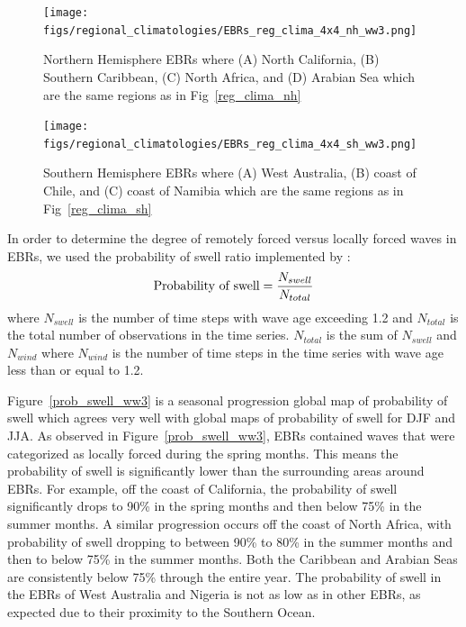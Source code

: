 \documentclass[draft,linenumbers]{agujournal2018}
\begin{document}
\begin{figure}[tbh]
\centering
\begin{minipage}{.5\textwidth}
  \centering
  \texttt{[image: figs/regional\_climatologies/EBRs\_reg\_clima\_4x4\_nh\_ww3.png]}
  \caption{Northern Hemisphere EBRs where (A) North California, (B) Southern Caribbean, (C) North Africa, and (D) Arabian Sea which are the same regions as in Fig~\ref{reg_clima_nh}}
  \label{NH_model_comparison}
\end{minipage}%
\begin{minipage}{.5\textwidth}
  \centering
  \texttt{[image: figs/regional\_climatologies/EBRs\_reg\_clima\_4x4\_sh\_ww3.png]}
  \caption{Southern Hemisphere EBRs where (A) West Australia, (B) coast of Chile, and (C) coast of Namibia which are the same regions as in Fig~\ref{reg_clima_sh}}
  \label{SH_model_comparison}
\end{minipage}
\label{ww3_ifremer_ccmp2_compare}
\end{figure}

In order to determine the degree of remotely forced versus locally forced waves in EBRs, we used the probability of swell ratio implemented by \citet{semedo2011global}:
\begin{equation}
    \mbox{\rm Probability of swell} = \frac{N_{swell}}{N_{total}}
\end{equation}
where $N_{swell}$ is the number of time steps with wave age exceeding 1.2 and $N_{total}$ is the total number of observations in the time series. $N_{total}$ is the sum of $N_{swell}$ and $N_{wind}$ where $N_{wind}$ is the number of time steps in the time series with wave age less than or equal to 1.2.

Figure~\ref{prob_swell_ww3} is a seasonal progression global map of probability of swell which agrees very well with \citet{semedo2011global} global maps of probability of swell for DJF and JJA. As observed in Figure~\ref{prob_swell_ww3}, EBRs contained waves that were categorized as locally forced during the spring months. This means the probability of swell is significantly lower than the surrounding areas around EBRs. For example, off the coast of California, the probability of swell significantly drops to 90\% in the spring months and then below 75\% in the summer months. A similar progression occurs off the coast of North Africa, with probability of swell dropping to between 90\% to 80\% in the summer months and then to below 75\% in the summer months. Both the Caribbean and Arabian Seas are consistently below 75\% through the entire year. The probability of swell in the EBRs of West Australia and Nigeria is not as low as in other EBRs, as expected due to their proximity to the Southern Ocean. 
\end{document}
